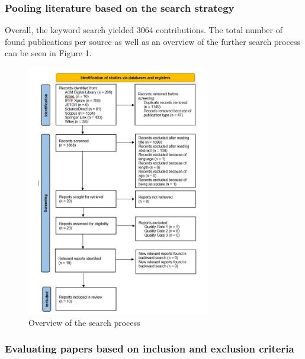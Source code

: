 \documentclass{bmcart}
\begin{document}

\subsubsection{Pooling literature based on the search strategy}
Overall, the keyword search yielded 3064 contributions. The total number of found publications per source as well as an overview of the further search process can be seen in Figure 1.

\begin{figure}[h]
    \centering 
    \includegraphics[width=8cm]{Media/PRISMA-Flowchart-V2.JPG}
    \caption{Overview of the search process}
    \label{fig:PRISMA}
\end{figure}

\subsubsection{Evaluating papers based on inclusion and exclusion criteria}
\end{document}
